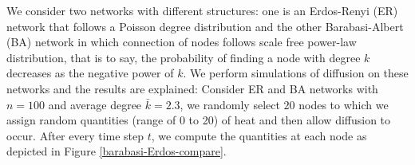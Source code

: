 \documentclass[10pt,a4paper]{article}
\theoremstyle{plain}
\theoremstyle{definition}
\begin{document}
     We consider two networks with different structures: one is an Erdos-Renyi (ER) network that follows a Poisson degree distribution and the other
     Barabasi-Albert (BA) network in which connection of nodes follows scale free power-law distribution, that is to say, the probability of finding a node with degree $k$ decreases as the negative power of $k$. We perform simulations of diffusion on these networks and the results are explained:
     Consider ER and BA networks with $n=100$ and average degree $\bar{k}= 2.3$, we randomly select $20$ nodes to which we assign random quantities (range of 0 to 20) of heat and then allow diffusion to occur. After every time step $t$, we compute the quantities at each node as depicted in Figure \ref{barabasi-Erdos-compare}.
\end{document}
